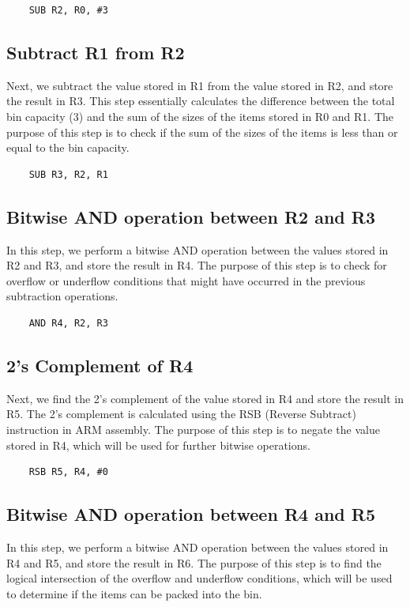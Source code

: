 \begin{verbatim}
    SUB R2, R0, #3
\end{verbatim}

\subsection{Subtract R1 from R2}
Next, we subtract the value stored in R1 from the value stored in R2, and store the result in R3. This step essentially calculates the difference between the total bin capacity (3) and the sum of the sizes of the items stored in R0 and R1. The purpose of this step is to check if the sum of the sizes of the items is less than or equal to the bin capacity.

\begin{verbatim}
    SUB R3, R2, R1
\end{verbatim}

\subsection{Bitwise AND operation between R2 and R3}
In this step, we perform a bitwise AND operation between the values stored in R2 and R3, and store the result in R4. The purpose of this step is to check for overflow or underflow conditions that might have occurred in the previous subtraction operations.

\begin{verbatim}
    AND R4, R2, R3
\end{verbatim}

\subsection{2's Complement of R4}
Next, we find the 2's complement of the value stored in R4 and store the result in R5. The 2's complement is calculated using the RSB (Reverse Subtract) instruction in ARM assembly. The purpose of this step is to negate the value stored in R4, which will be used for further bitwise operations.

\begin{verbatim}
    RSB R5, R4, #0
\end{verbatim}

\subsection{Bitwise AND operation between R4 and R5}
In this step, we perform a bitwise AND operation between the values stored in R4 and R5, and store the result in R6. The purpose of this step is to find the logical intersection of the overflow and underflow conditions, which will be used to determine if the items can be packed into the bin.

